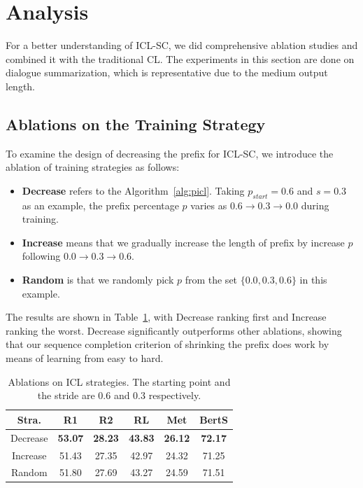 \section{Analysis}


For a better understanding of ICL-SC, 
we did comprehensive ablation studies and combined it with the traditional CL. The experiments in this section are done on dialogue summarization, which is representative due to the medium output length.




\subsection{Ablations on the Training Strategy}

To examine the design of decreasing the prefix for ICL-SC, we introduce the ablation of training strategies as follows:
\begin{itemize}
	\item \textbf{Decrease} refers to the Algorithm~\ref{alg:picl}. Taking $p_{start}=0.6$ and $s=0.3$ as an example, the prefix percentage $p$ varies as $0.6\rightarrow 0.3\rightarrow 0.0$ during training.
	\item \textbf{Increase} means that we gradually increase the length of prefix by increase $p$ following $0.0\rightarrow0.3\rightarrow0.6$.
	\item \textbf{Random} is that we randomly pick $p$ from the set $\{0.0, 0.3, 0.6\}$ in this example.
\end{itemize}

The results are shown in Table~\ref{tab:ablstrategy}, with Decrease ranking first and Increase ranking the worst.
Decrease significantly outperforms other ablations, showing that our sequence completion criterion of shrinking the prefix does work by means of learning from easy to hard.

\begin{table}[h]
	\scriptsize
	\centering
	\begin{tabular}{cccccc}
		\hline
		{Stra.} & {R1} & {R2} & {RL} & {Met} & {BertS} \\
		\hline
		Decrease &\textbf{53.07} & \textbf{28.23} & \textbf{43.83} & \textbf{26.12} & \textbf{72.17}\\
		Increase & 51.43 & 27.35 & 42.97 & 24.32 & 71.25 \\
		Random & 51.80 & 27.69 & 43.27 & 24.59 & 71.51 \\
		\hline
	\end{tabular}
	\caption{Ablations on ICL strategies. The starting point and the stride are 0.6 and 0.3 respectively.}
	\label{tab:ablstrategy}
\end{table}


